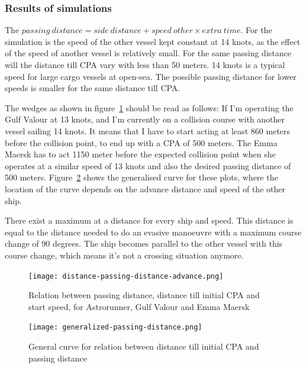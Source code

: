 \subsubsection{Results of simulations}
The $passing~distance = side~distance + speed~other \times extra~time$.
For the simulation is the speed of the other vessel kept constant at 14 knots, as the effect of the speed of another vessel is relatively small. For the same passing distance will the distance till CPA vary with less than 50 meters. 14 knots is a typical speed for large cargo vessels at open-sea. The possible passing distance for lower speeds is smaller for the same distance till CPA.

The wedges as shown in figure~\ref{fig:result-distance-passing-distance-start-speed} should be read as follows: If I'm operating the Gulf Valour at 13 knots, and I'm currently on a collision course with another vessel sailing 14 knots. It means that I have to start acting at least 860 meters before the collision point, to end up with a \ac{CPA} of 500 meters.
The Emma Maersk has to act 1150 meter before the expected collision point when she operates at a similar speed of 13 knots and also the desired passing distance of 500 meters. Figure~\ref{fig:general-advance-passing} shows the generalised curve for these plots, where the location of the curve depends on the advance distance and speed of the other ship.

There exist a maximum at a distance for every ship and speed. This distance is equal to the distance needed to do an evasive manoeuvre with a maximum course change of 90 degrees. The ship becomes parallel to the other vessel with this course change, which means it's not a crossing situation anymore.

\begin{figure}[!p]
	\centering
	\texttt{[image: distance-passing-distance-advance.png]} 
	\caption{Relation between passing distance, distance till initial CPA and start speed, for Astrorunner, Gulf Valour and Emma Maersk}
	\label{fig:result-distance-passing-distance-start-speed} 
\end{figure}

\begin{figure}[p]
	\centering
	\texttt{[image: generalized-passing-distance.png]}
	\caption{General curve for relation between distance till initial CPA and passing distance}
	\label{fig:general-advance-passing} 
\end{figure}


